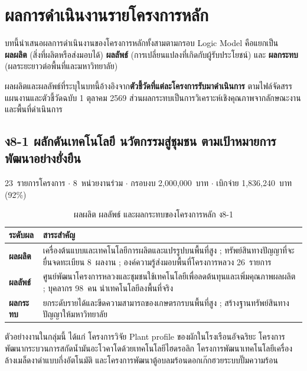 \chapter{ผลการดำเนินงานรายโครงการหลัก}

บทนี้นำเสนอผลการดำเนินงานของโครงการหลักทั้งสามตามกรอบ Logic Model
คือแยกเป็น \textbf{ผลผลิต} (สิ่งที่ผลิตหรือส่งมอบได้) \textbf{ผลลัพธ์} (การเปลี่ยนแปลงที่เกิดกับผู้รับประโยชน์)
และ \textbf{ผลกระทบ} (ผลระยะยาวต่อพื้นที่และมหาวิทยาลัย)

\begin{infobox}
ผลผลิตและผลลัพธ์ที่ระบุในบทนี้อ้างอิงจาก\textbf{ตัวชี้วัดที่แต่ละโครงการรับมาดำเนินการ}
ตามไฟล์จัดสรรแผนงานและตัวชี้วัดฉบับ 1 ตุลาคม 2569
ส่วนผลกระทบเป็นการวิเคราะห์เชิงคุณภาพจากลักษณะงานและพื้นที่ดำเนินการ
\end{infobox}

\section{ง8-1 ผลักดันเทคโนโลยี นวัตกรรมสู่ชุมชน ตามเป้าหมายการพัฒนาอย่างยั่งยืน}
23~รายการโครงการ $\cdot$ 8~หน่วยงานร่วม $\cdot$ กรอบงบ 2,000,000~บาท $\cdot$ เบิกจ่าย 1,836,240~บาท (92\%)

\begin{table}[H]
\centering
\caption{ผลผลิต ผลลัพธ์ และผลกระทบของโครงการหลัก ง8-1}
\small
\begin{tabular}{L{2.2cm}L{11.5cm}}
\toprule
{}
\textbf{ระดับผล} & \textbf{สาระสำคัญ}\\
\midrule
\textbf{ผลผลิต} & เครื่องต้นแบบและเทคโนโลยีการผลิตและแปรรูปบนพื้นที่สูง ; ทรัพย์สินทางปัญญาที่จะยื่นจดทะเบียน 8~ผลงาน ; องค์ความรู้ส่งมอบพื้นที่โครงการหลวง 26~รายการ\\
\textbf{ผลลัพธ์} & ศูนย์พัฒนาโครงการหลวงและชุมชนใช้เทคโนโลยีเพื่อลดต้นทุนและเพิ่มคุณภาพผลผลิต ; บุคลากร 98~คน นำเทคโนโลยีลงพื้นที่จริง\\
\textbf{ผลกระทบ} & ยกระดับรายได้และขีดความสามารถของเกษตรกรบนพื้นที่สูง ; สร้างฐานทรัพย์สินทางปัญญาให้มหาวิทยาลัย\\
\bottomrule
\end{tabular}
\end{table}

ตัวอย่างงานในกลุ่มนี้ ได้แก่ โครงการวิจัย Plant profile ของผักในโรงเรือนอัจฉริยะ
โครงการพัฒนากระบวนการสกัดน้ำมันอะโวคาโดด้วยเทคโนโลยีไฮดรอลิก
โครงการพัฒนาเทคโนโลยีเครื่องล้างเมล็ดงาดำแบบกึ่งอัตโนมัติ
และโครงการพัฒนาตู้อบลมร้อนดอกเก๊กฮวยระบบปั๊มความร้อน

